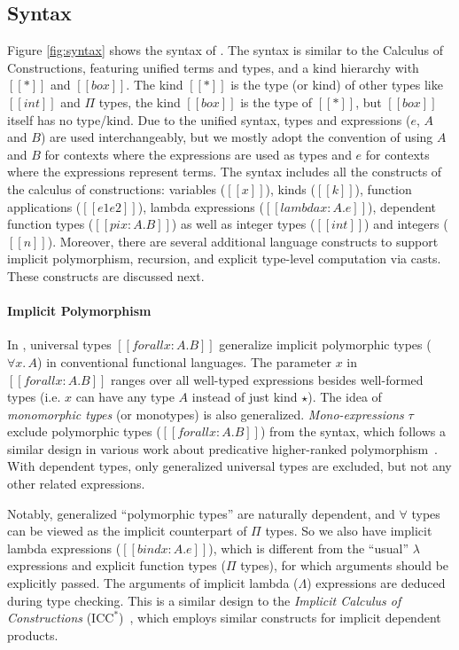 \subsection{Syntax}

Figure \ref{fig:syntax} shows the syntax of \name. The syntax is similar
to the Calculus of Constructions, featuring unified terms and types,
and a kind hierarchy with $[[*]]$ and $[[box]]$.
The kind $[[*]]$ is the type (or kind) of other types like $[[int]]$ and $\Pi$ types,
the kind $[[box]]$ is the type of $[[*]]$, but $[[box]]$ itself has no type/kind.
Due to the unified syntax, types and
expressions ($e$, $A$ and $B$) are used
interchangeably, but we mostly adopt the convention of using $A$ and $B$
for contexts where the expressions are used as types and $e$ for contexts
where the expressions represent terms.
The syntax includes all the constructs of the calculus of constructions:
variables ($[[x]]$), kinds ($[[k]]$), function applications  ($[[e1 e2]]$),
lambda expressions ($[[lambda x : A. e]]$), dependent function types ($[[pi x : A. B]]$)
as well as integer types ($[[int]]$) and integers ($[[n]]$).
Moreover, there are several additional language constructs to
support implicit polymorphism, recursion, and explicit type-level computation
via casts. These constructs are discussed next.

\paragraph{Implicit Polymorphism}

In \name, universal types $[[forall x : A. B]]$ generalize implicit
polymorphic types ($\forall x.\, A$) in conventional functional languages.
The parameter $x$ in $[[forall x : A. B]]$ ranges over all well-typed expressions besides well-formed
types (i.e. $x$ can have any type $A$ instead of just kind $\star$). The idea of
\emph{monomorphic types} (or monotypes) is also generalized.
\emph{Mono-expressions} $\tau$ exclude polymorphic types ($[[forall x : A. B]]$) from the syntax,
which follows a similar design in various work about predicative
higher-ranked polymorphism~\citep{odersky1996putting,dunfield2013complete,jones2007practical}.
With dependent types, only generalized universal types are excluded, but not
any other related expressions.

Notably,
generalized ``polymorphic types'' are naturally dependent, and $\forall$
types can be viewed as the implicit counterpart of $\Pi$ types.
So we also have implicit lambda expressions ($[[bind x : A. e]]$),
which is different from the ``usual'' $\lambda$ expressions and explicit function
types ($\Pi$ types), for which arguments should be explicitly passed. The arguments
of implicit lambda ($\Lambda$) expressions are deduced during type checking.
This is a similar design to
the \emph{Implicit Calculus of Constructions} ($\text{ICC}^*$)~\citep{barras2008implicit}, which
employs similar constructs for implicit dependent products.

